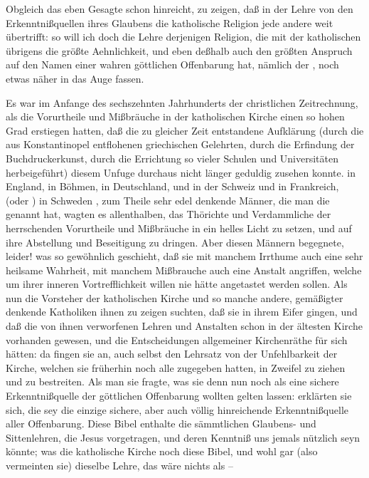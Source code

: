 \begin{aufza}
\item Obgleich das eben Gesagte schon hinreicht, zu zeigen, daß in der Lehre von den Erkenntnißquellen ihres Glaubens die katholische Religion jede andere weit übertrifft: so will ich doch die Lehre derjenigen Religion, die mit der katholischen übrigens die größte Aehnlichkeit, und eben deßhalb auch den größten Anspruch auf den Namen einer wahren göttlichen Offenbarung hat, nämlich der , noch etwas näher in das Auge fassen.~
\item Es war im Anfange des sechszehnten Jahrhunderts der christlichen Zeitrechnung, als die Vorurtheile und Mißbräuche in der katholischen Kirche einen so hohen Grad erstiegen hatten, daß die zu gleicher Zeit entstandene Aufklärung (durch die aus Konstantinopel entflohenen griechischen Gelehrten, durch die Erfindung der Buchdruckerkunst, durch die Errichtung so vieler Schulen und Universitäten herbeigeführt) diesem Unfuge durchaus nicht länger geduldig zusehen konnte.  in England,  in Böhmen,  in Deutschland,  und  in der Schweiz und in Frankreich,  (oder ) in Schweden \umA , zum Theile sehr edel denkende Männer, die man die  genannt hat, wagten es allenthalben, das Thörichte und Verdammliche der herrschenden Vorurtheile und Mißbräuche in ein helles Licht zu setzen, und auf ihre Abstellung und Beseitigung zu dringen. Aber diesen Männern begegnete, leider! was so gewöhnlich geschieht, daß sie mit manchem Irrthume auch eine sehr heilsame Wahrheit, mit manchem Mißbrauche auch eine Anstalt angriffen, welche um ihrer inneren Vortrefflichkeit willen nie hätte angetastet werden sollen. Als nun die Vorsteher der katholischen Kirche und so manche andere, gemäßigter denkende Katholiken ihnen zu zeigen suchten, daß sie in ihrem Eifer  gingen, und daß die von ihnen verworfenen Lehren und Anstalten schon in der ältesten Kirche vorhanden gewesen, und die Entscheidungen allgemeiner Kirchenräthe für sich hätten: da fingen sie an, auch selbst den Lehrsatz von der Unfehlbarkeit der Kirche, welchen sie früherhin noch alle zugegeben hatten, in Zweifel zu ziehen und zu bestreiten. Als man sie fragte, was sie denn nun noch als eine sichere Erkenntnißquelle der göttlichen Offenbarung wollten gelten lassen: erklärten sie sich, die  sey die einzige sichere, aber auch völlig hinreichende Erkenntnißquelle aller Offenbarung. Diese Bibel enthalte die sämmtlichen Glaubens- und Sittenlehren, die Jesus vorgetragen, und deren Kenntniß uns jemals nützlich seyn könnte; was die katholische Kirche noch  diese Bibel, und wohl gar (also vermeinten sie)  dieselbe Lehre, das wäre nichts als --

\end{aufza}
